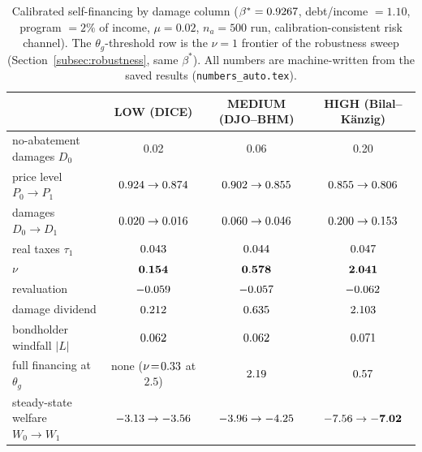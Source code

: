 \documentclass[12pt]{article}
\begin{document}
\begin{table}[!htb]
\centering
\caption{Calibrated self-financing by damage column
($\beta^{*}=0.9267$, debt/income $=1.10$, program $=2\%$ of income,
$\mu=0.02$, $n_a=500$ run, calibration-consistent risk channel). The
$\theta_g$-threshold row is the $\nu=1$ frontier of the robustness sweep
(Section~\ref{subsec:robustness}, same $\beta^{*}$). All numbers are
machine-written from the saved results (\texttt{numbers\_auto.tex}).}
\label{tab:calibrated}
\footnotesize
\setlength{\tabcolsep}{4pt}
\begin{tabular}{lccc}
\toprule
 & LOW (DICE) & MEDIUM (DJO--BHM) & HIGH (Bilal--K\"anzig) \\
\midrule
no-abatement damages $D_0$    & 0.02   & 0.06   & 0.20 \\
price level $P_0 \to P_1$     & $0.924 \to 0.874$ & $0.902 \to 0.855$ & $0.855 \to 0.806$ \\
damages $D_0 \to D_1$         & $0.020 \to 0.016$ & $0.060 \to 0.046$ & $0.200 \to 0.153$ \\
real taxes $\tau_1$           & $0.043$  & $0.044$  & $0.047$ \\
\midrule
$\nu$                          & $\mathbf{0.154}$ & $\mathbf{0.578}$ & $\mathbf{2.041}$ \\
\quad revaluation              & $-0.059$ & $-0.057$ & $-0.062$ \\
\quad damage dividend          & $0.212$  & $0.635$  & $2.103$ \\
bondholder windfall $|L|$      & $0.062$  & $0.062$  & $0.071$ \\
full financing at $\theta_g$   & none ($\nu\!=\!0.33$ at $2.5$) & $2.19$ & $0.57$ \\
steady-state welfare $W_0 \to W_1$ & $-3.13 \to -3.56$ & $-3.96 \to -4.25$ & $-7.56 \to \mathbf{-7.02}$ \\
\bottomrule
\end{tabular}
\end{table}
\end{document}
